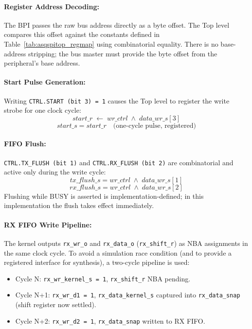 \paragraph{Register Address Decoding:}
The BPI passes the raw bus address directly as a byte offset. The Top level
compares this offset against the constants defined in Table~\ref{tab:asqspitop_regmap}
using combinatorial equality. There is no base-address stripping; the bus master
must provide the byte offset from the peripheral's base address.

\paragraph{Start Pulse Generation:}
Writing \texttt{CTRL.START (bit 3) = 1} causes the Top level to register the
write strobe for one clock cycle:
\[
  start\_r \;\leftarrow\; wr\_ctrl \;\land\; data\_wr\_s[3]
\]
\[
  start\_s = start\_r \quad \text{(one-cycle pulse, registered)}
\]

\paragraph{FIFO Flush:}
\texttt{CTRL.TX\_FLUSH (bit 1)} and \texttt{CTRL.RX\_FLUSH (bit 2)} are
combinatorial and active only during the write cycle:
\[
  tx\_flush\_s = wr\_ctrl \;\land\; data\_wr\_s[1]
\]
\[
  rx\_flush\_s = wr\_ctrl \;\land\; data\_wr\_s[2]
\]
Flushing while BUSY is asserted is implementation-defined; in this
implementation the flush takes effect immediately.

\paragraph{RX FIFO Write Pipeline:}
The kernel outputs \texttt{rx\_wr\_o} and \texttt{rx\_data\_o} (\texttt{rx\_shift\_r})
as NBA assignments in the same clock cycle. To avoid a simulation race condition
(and to provide a registered interface for synthesis), a two-cycle pipeline
is used:
\begin{itemize}
  \item Cycle N: \texttt{rx\_wr\_kernel\_s = 1}, \texttt{rx\_shift\_r} NBA pending.
  \item Cycle N+1: \texttt{rx\_wr\_d1 = 1}, \texttt{rx\_data\_kernel\_s} captured
    into \texttt{rx\_data\_snap} (shift register now settled).
  \item Cycle N+2: \texttt{rx\_wr\_d2 = 1}, \texttt{rx\_data\_snap} written to RX FIFO.
\end{itemize}


